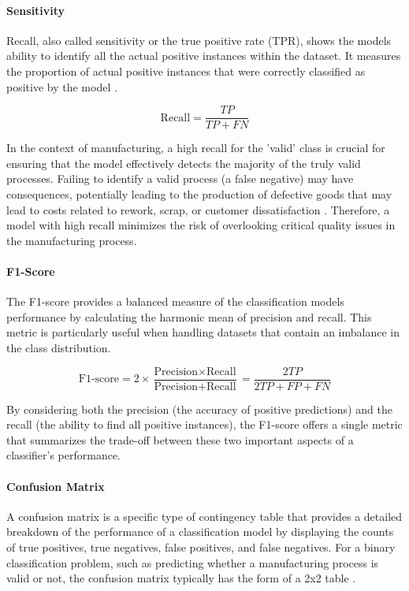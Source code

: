 \paragraph{\textbf{Sensitivity}}
Recall, also called sensitivity or the true positive rate (TPR), shows the models ability to identify all the actual positive instances within the dataset. It measures the proportion of actual positive instances that were correctly classified as positive by the model \autocite{fahrmeir2016statistik}.

\begin{equation}
    \label{eq:recall}
    \text{Recall} = \frac{TP}{TP + FN}
\end{equation}

In the context of manufacturing, a high recall for the 'valid' class is crucial for ensuring that the model effectively detects the majority of the truly valid processes. Failing to identify a valid process (a false negative) may have consequences, potentially leading to the production of defective goods that may lead to costs related to rework, scrap, or customer dissatisfaction \autocite{kharitonov2022comparative}. Therefore, a model with high recall minimizes the risk of overlooking critical quality issues in the manufacturing process.

\paragraph{\textbf{F1-Score}}
The F1-score provides a balanced measure of the classification models performance by calculating the harmonic mean of precision and recall. This metric is particularly useful when handling datasets that contain an imbalance in the class distribution.

\begin{equation}
    \label{eq:F1-score}
    \text{F1-score} = 2 \times \frac{\text{Precision} \times \text{Recall}}{\text{Precision} + \text{Recall}} = \frac{2TP}{2TP + FP + FN}
\end{equation}

By considering both the precision (the accuracy of positive predictions) and the recall (the ability to find all positive instances), the F1-score offers a single metric that summarizes the trade-off between these two important aspects of a classifier's performance.

\paragraph{\textbf{Confusion Matrix}}
A confusion matrix is a specific type of contingency table that provides a detailed breakdown of the performance of a classification model by displaying the counts of true positives, true negatives, false positives, and false negatives. For a binary classification problem, such as predicting whether a manufacturing process is valid or not, the confusion matrix typically has the form of a 2x2 table \autocite{fahrmeir2016statistik}.

